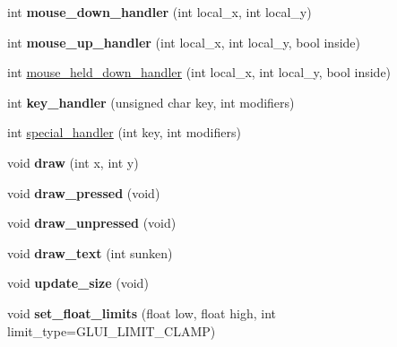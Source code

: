 \begin{DoxyCompactItemize}
\item 
\hypertarget{classGLUI__Spinner_aa88057ac6073205f9e1509cad08e6b0b}{int {\bfseries mouse\-\_\-down\-\_\-handler} (int local\-\_\-x, int local\-\_\-y)}\label{classGLUI__Spinner_aa88057ac6073205f9e1509cad08e6b0b}

\item 
\hypertarget{classGLUI__Spinner_a85650009d91d672e3c192f60760b1704}{int {\bfseries mouse\-\_\-up\-\_\-handler} (int local\-\_\-x, int local\-\_\-y, bool inside)}\label{classGLUI__Spinner_a85650009d91d672e3c192f60760b1704}

\item 
int \hyperlink{classGLUI__Spinner_aae95829438240c9b6a293905356e322c}{mouse\-\_\-held\-\_\-down\-\_\-handler} (int local\-\_\-x, int local\-\_\-y, bool inside)
\item 
\hypertarget{classGLUI__Spinner_a29dd55ebbd9967c508b0d6aad85d209a}{int {\bfseries key\-\_\-handler} (unsigned char key, int modifiers)}\label{classGLUI__Spinner_a29dd55ebbd9967c508b0d6aad85d209a}

\item 
int \hyperlink{classGLUI__Spinner_a22e78681f3b47b2b5436686ad23523bb}{special\-\_\-handler} (int key, int modifiers)
\item 
\hypertarget{classGLUI__Spinner_ab2b6082a468a3cf5fd720dda38460230}{void {\bfseries draw} (int x, int y)}\label{classGLUI__Spinner_ab2b6082a468a3cf5fd720dda38460230}

\item 
\hypertarget{classGLUI__Spinner_add363e211d0f0638ce83cefe18853ec5}{void {\bfseries draw\-\_\-pressed} (void)}\label{classGLUI__Spinner_add363e211d0f0638ce83cefe18853ec5}

\item 
\hypertarget{classGLUI__Spinner_a7e2a6eab40bb6cd68732ae9a3a3eb1bc}{void {\bfseries draw\-\_\-unpressed} (void)}\label{classGLUI__Spinner_a7e2a6eab40bb6cd68732ae9a3a3eb1bc}

\item 
\hypertarget{classGLUI__Spinner_a0e5448695af2091ce345460e62c81936}{void {\bfseries draw\-\_\-text} (int sunken)}\label{classGLUI__Spinner_a0e5448695af2091ce345460e62c81936}

\item 
\hypertarget{classGLUI__Spinner_a4cde5eb0183892fc45de009844894e42}{void {\bfseries update\-\_\-size} (void)}\label{classGLUI__Spinner_a4cde5eb0183892fc45de009844894e42}

\item 
\hypertarget{classGLUI__Spinner_ac6a2c44defbf97ef70375ab8d0f9cb45}{void {\bfseries set\-\_\-float\-\_\-limits} (float low, float high, int limit\-\_\-type=G\-L\-U\-I\-\_\-\-L\-I\-M\-I\-T\-\_\-\-C\-L\-A\-M\-P)}\label{classGLUI__Spinner_ac6a2c44defbf97ef70375ab8d0f9cb45}


\end{DoxyCompactItemize}
